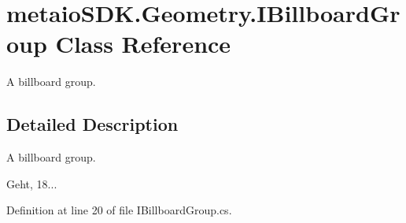 \section{metaio\-S\-D\-K.\-Geometry.\-I\-Billboard\-Group Class Reference}
\label{classmetaio_s_d_k_1_1_geometry_1_1_i_billboard_group}


A billboard group.  




\subsection{Detailed Description}
A billboard group. 

Geht, 18... 

Definition at line 20 of file I\-Billboard\-Group.\-cs.

